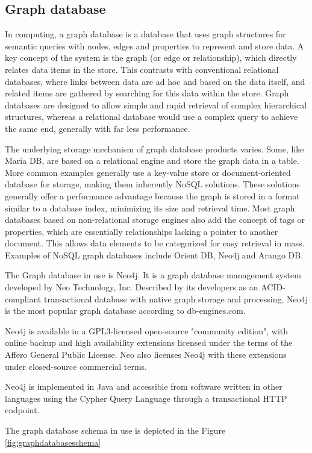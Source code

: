 \subsection{Graph database}
\par 
In computing, a graph database is a database that uses graph structures for semantic queries with nodes, edges and properties to represent and store data. A key concept of the system is the graph (or edge or relationship), which directly relates data items in the store. This contrasts with conventional relational databases, where links between data are ad hoc and based on the data itself, and related items are gathered by searching for this data within the store. Graph databases are designed to allow simple and rapid retrieval of complex hierarchical structures, whereas a relational database would use a complex query to achieve the same end, generally with far less performance.
\par The underlying storage mechanism of graph database products varies. Some, like Maria DB, are based on a relational engine and store the graph data in a table. More common examples generally use a key-value store or document-oriented database for storage, making them inherently NoSQL solutions. These solutions generally offer a performance advantage because the graph is stored in a format similar to a database index, minimizing its size and retrieval time. Most graph databases based on non-relational storage engines also add the concept of tags or properties, which are essentially relationships lacking a pointer to another document. This allows data elements to be categorized for easy retrieval in mass. Examples of NoSQL graph databases include Orient DB, Neo4j and Arango DB.
\par The Graph database in use is Neo4j. It is a graph database management system developed by Neo Technology, Inc. Described by its developers as an ACID-compliant transactional database with native graph storage and processing, Neo4j is the most popular graph database according to db-engines.com.
\par Neo4j is available in a GPL3-licensed open-source "community edition", with online backup and high availability extensions licensed under the terms of the Affero General Public License. Neo also licenses Neo4j with these extensions under closed-source commercial terms.
\par Neo4j is implemented in Java and accessible from software written in other languages using the Cypher Query Language through a transactional HTTP endpoint.
 \par The graph database schema in use is depicted in the Figure \ref{fig:graphdatabaseschema}

